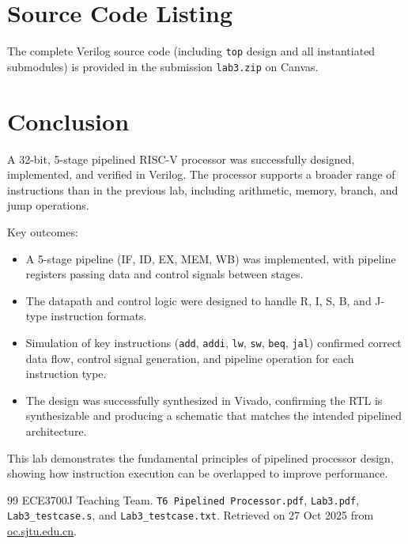 \documentclass{article}
\begin{document}
\section{Source Code Listing}
\label{sec:source}

The complete Verilog source code (including \texttt{top} design and all instantiated submodules) is provided in the submission \texttt{lab3.zip} on Canvas.

\section{Conclusion}

A 32-bit, 5-stage pipelined RISC-V processor was successfully designed, implemented, and verified in Verilog. The processor supports a broader range of instructions than in the previous lab, including arithmetic, memory, branch, and jump operations.

Key outcomes:
\begin{itemize}
    \item A 5-stage pipeline (IF, ID, EX, MEM, WB) was implemented, with pipeline registers passing data and control signals between stages.
    \item The datapath and control logic were designed to handle R, I, S, B, and J-type instruction formats.
    \item Simulation of key instructions (\texttt{add}, \texttt{addi}, \texttt{lw}, \texttt{sw}, \texttt{beq}, \texttt{jal}) confirmed correct data flow, control signal generation, and pipeline operation for each instruction type.
    \item The design was successfully synthesized in Vivado, confirming the RTL is synthesizable and producing a schematic that matches the intended pipelined architecture.
\end{itemize}

This lab demonstrates the fundamental principles of pipelined processor design, showing how instruction execution can be overlapped to improve performance.

\newpage
\begin{thebibliography}{99} 
 ECE3700J Teaching Team. \texttt{T6 Pipelined Processor.pdf}, \texttt{Lab3.pdf}, \texttt{Lab3\_testcase.s}, and \texttt{Lab3\_testcase.txt}. Retrieved on 27 Oct 2025 from \hyperlink{site}{oc.sjtu.edu.cn}.
\end{thebibliography}
\end{document}
